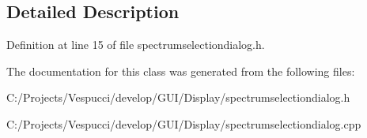 \subsection{Detailed Description}


Definition at line 15 of file spectrumselectiondialog.\+h.



The documentation for this class was generated from the following files\+:\begin{DoxyCompactItemize}
\item 
C\+:/\+Projects/\+Vespucci/develop/\+G\+U\+I/\+Display/spectrumselectiondialog.\+h\item 
C\+:/\+Projects/\+Vespucci/develop/\+G\+U\+I/\+Display/spectrumselectiondialog.\+cpp\end{DoxyCompactItemize}
